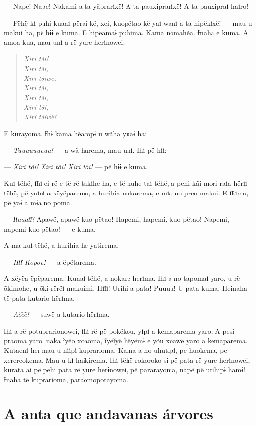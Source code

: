 --- Nape! Nape! Nakami a ta yãprarɨxë! A ta pauxiprarɨxë! A ta pauxipraɨ
haɨro! 

--- Pëhë kɨ puhi kuaaɨ përai kë, xei, kuopëtao kë yaɨ wanɨ a ta hipëkɨxë!
--- mau u makui ha, pë hɨɨ e kuma. E hipëamaɨ puhima. Kama nomahẽa.
Ɨnaha e kuma. A amoa kua, mau unɨ a rë yure herɨnowei: 

\begin{verse}
\textit{Xiri tõi!\\
Xiri tõi,\\
Xiri tõiwë,\\
Xiri tõi,\\
Xiri tõi,\\
Xiri tõi,\\
Xiri tõiwë!}
\end{verse}

E kurayoma. Ɨhɨ kama hẽaropɨ u wãha yuaɨ ha: 

--- \textit{Tuuuuuuuuu!} --- a wã hurema, mau unɨ. Ɨhɨ pë hɨɨ: 

--- \textit{Xiri tõi! Xiri tõi! Xiri tõi!} --- pë hɨɨ e kuma. 

Kuɨ tëhë, ɨ̃hɨ ei rë e të rë takɨhe ha, e të huhe taɨ tëhë, a pehi kãi
mori raɨa hërɨɨ tëhë, pë yaɨnɨ a xëyëparema, a hurihia nokarema, e mɨa
no preo makui. E ɨ̃kɨma, pë yaɨ a mɨa no poma. 

--- \textit{Ɨɨaaaɨ̃ɨ!} Apawë, apawë kuo pëtao! Hapemi, hapemi, kuo pëtao! Napemi,
napemi kuo pëtao! --- e kuma. 

A ma kuɨ tëhë, a hurihia he yatirema. 

--- \textit{Hɨ̃ɨ Kopou!} --- a ëpëtarema. 

A xëyëa ëpëparema. Kuaaɨ tëhë, a nokare herɨma. Ɨhɨ a no tapomaɨ yaro, u
rë õkimohe, u õki rërëɨ makuimi. Hɨ̃ɨɨ! Urihi a pata! Puuuu! U pata kuma.
Heinaha të pata kutario hërɨma.

--- \textit{Aëëë!} --- suwë a kutario hërɨma. 

Ɨhɨ a rë potuprarionowei, ɨ̃hɨ rë pë pokëkou, yɨpɨ a kemaparema yaro. A pesi praoma yaro, naka ĩyëo xoaoma, ĩyëĩyë hëyëmɨ e yõu xoawë yaro a
kemaparema. Kutaenɨ hei mau u nɨɨpɨ kuprarioma. Kama a no uhutipɨ, pë
huokema, pë xerereokema. Mau u kɨ haikirema. Ɨhɨ tëhë rokoroko si pë
pata rë yure herɨnowei, kurata ai pë pehi pata rë yure herɨnowei, pë
pararayoma, napë pë urihipɨ hamɨ! Ɨnaha të kuprarioma, paraomopotayoma.

 \chapter[A anta que andava nas árvores]{A anta que andava\break nas árvores}
 
